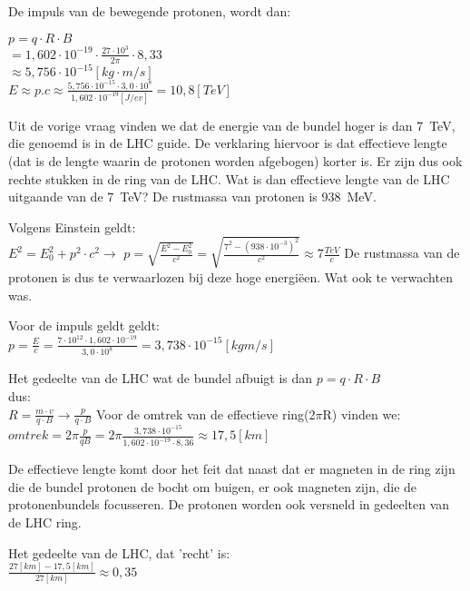 \begin{questions}
\begin{solution}
De impuls van de bewegende protonen, wordt dan:

$ p = q \cdot R \cdot B $ \\
$   = 1,602 \cdot 10^{-19} \cdot \frac{27\cdot 10^3}{2\pi} \cdot 8,33 $ \\
$ \approx 5,756 \cdot 10^{-15} [kg\cdot m/s]$ \\
$ E \approx p.c \approx \frac{5,756 \cdot 10^{-15} \cdot 3,0 \cdot 10^8}{1,602 \cdot 10^{-19} [J/ev]} = 10,8 [TeV]$

\end{solution}

\question
Uit de vorige vraag vinden we dat de energie van de bundel hoger is dan \SI{7}{\tera\electronvolt},
die genoemd is in de LHC guide. De verklaring hiervoor is dat effectieve lengte (dat is de lengte waarin de protonen worden
afgebogen) korter is. Er zijn dus ook rechte stukken in de ring van de LHC.
Wat is dan effectieve lengte van de LHC uitgaande van de
\SI{7}{\tera\electronvolt}? De rustmassa van protonen is \SI{938}{\mega\electronvolt}.

\begin{solution}
Volgens Einstein geldt:\\
$E^2 = E_0^2 + p^2 \cdot c^2 \rightarrow $
$p = \sqrt{\frac{E^2 -E_0^2}{c^2}} = \sqrt{\frac{7^2 -(938 \cdot 10^{-3})^2}{c^2}} \approx 7\frac{TeV}{c}$
De rustmassa van de protonen is dus te verwaarlozen bij deze hoge energiëen.
Wat ook te verwachten was.

Voor de impuls geldt geldt: \\
$p = \frac{E}{c} = \frac{7 \cdot 10^{12} \cdot 1,602 \cdot 10^{-19}}{3,0 \cdot 10^8} = 3,738 \cdot 10^{-15} [kg m/s]$

Het gedeelte van de LHC wat de bundel afbuigt is dan
$ p = q \cdot R \cdot B $ \\
dus: \\
$R = \frac{m \cdot v}{q \cdot B} \rightarrow \frac{p}{q\cdot B} $
Voor de omtrek van de effectieve ring(2$\pi$R) vinden we: \\

$omtrek = 2 \pi \frac{p}{qB} = 2 \pi \frac{3,738 \cdot 10^{-15}}{1,602 \cdot 10^{-19} \cdot 8,36} \approx 17,5 [km]$

De effectieve lengte komt door het feit dat naast dat er magneten in de ring zijn
die de bundel protonen de bocht om buigen, er ook magneten zijn, die de protonenbundels focusseren.
De protonen worden ook versneld in gedeelten van de LHC ring.

Het gedeelte van de LHC, dat 'recht' is: \\
$ \frac{27 [km] - 17,5 [km]}{27 [km]} \approx 0,35$
\end{solution}


\end{questions}
